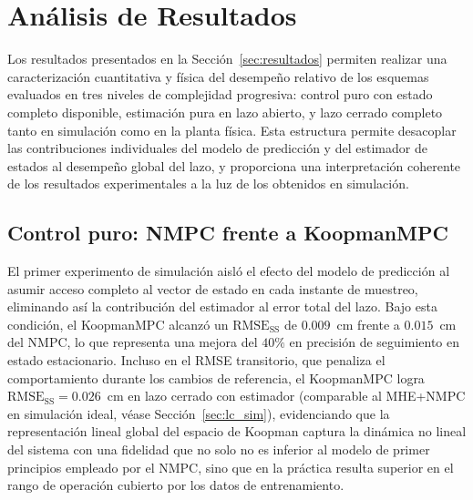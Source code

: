 \documentclass[12pt,letterpaper]{article}
\begin{document}
\section{Análisis de Resultados}
\label{sec:analisis}

Los resultados presentados en la Sección~\ref{sec:resultados} 
permiten realizar una caracterización cuantitativa y física del 
desempeño relativo de los esquemas evaluados en tres niveles de 
complejidad progresiva: control puro con estado completo disponible, 
estimación pura en lazo abierto, y lazo cerrado completo tanto en 
simulación como en la planta física. Esta estructura permite 
desacoplar las contribuciones individuales del modelo de predicción 
y del estimador de estados al desempeño global del lazo, y 
proporciona una interpretación coherente de los resultados 
experimentales a la luz de los obtenidos en simulación.

\subsection{Control puro: NMPC frente a KoopmanMPC}
\label{sec:analisis_ctrl}

El primer experimento de simulación aisló el efecto del modelo de 
predicción al asumir acceso completo al vector de estado en cada 
instante de muestreo, eliminando así la contribución del estimador 
al error total del lazo. Bajo esta condición, el KoopmanMPC alcanzó 
un $\mathrm{RMSE}_{\mathrm{SS}}$ de $0.009$~cm frente a $0.015$~cm 
del NMPC, lo que representa una mejora del $40\%$ en precisión de 
seguimiento en estado estacionario. Incluso en el RMSE transitorio, 
que penaliza el comportamiento durante los cambios de referencia, el 
KoopmanMPC logra $\mathrm{RMSE}_{\mathrm{SS}} = 0.026$~cm en lazo
cerrado con estimador (comparable al MHE+NMPC en simulación ideal,
véase Sección~\ref{sec:lc_sim}), evidenciando que la representación
lineal global del espacio de Koopman captura la dinámica no lineal
del sistema con una fidelidad 
que no solo no es inferior al modelo de primer principios empleado 
por el NMPC, sino que en la práctica resulta superior en el rango 
de operación cubierto por los datos de entrenamiento.
\end{document}
